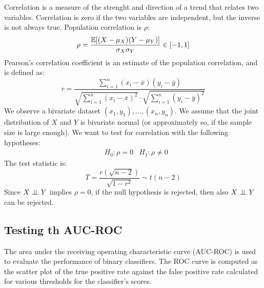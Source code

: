 Correlation is a measure of the strenght and direction of a trend that relates two variables. Correlation is zero if the two variables are independent, but the inverse is not always true. Population correlation is $\rho$:
\begin{equation*}
    \rho = \frac{\mathbb{E} [(X - \mu_X)(Y - \mu_Y)]}{\sigma_X \sigma_Y} \in [-1,1]
\end{equation*}
Pearson's correlation coefficient is an estimate of the population correlation, and is defined as:
\begin{equation*}
    r = \frac{\sum_{i=1}^n (x_i - \bar{x})(y_i - \bar{y})}{\sqrt{\sum_{i=1}^n (x_i - \bar{x})^2} \cdot \sqrt{\sum_{i=1}^n (y_i - \bar{y})^2}}
\end{equation*}
We observe a bivariate dataset $(x_1, y_1), \ldots, (x_n, y_n)$. We assume that the joint distribution of $X$ and $Y$ is bivariate normal (or approximately so, if the sample size is large enough). We want to test for correlation with the following hypotheses:
\begin{align*}
    &H_0 : \rho = 0 &H_1 : \rho \neq 0
\end{align*}
The test statistic is:
\begin{equation*}
    T = \frac{r(\sqrt{n-2})}{\sqrt{1 - r^2}} \sim t(n-2)
\end{equation*}
Since $X \perp \!\!\! \perp Y$ implies $\rho = 0$, if the null hypothesis is rejected, then also $X \perp \!\!\! \perp Y$ can be rejected.

\subsection{Testing th AUC-ROC}

The area under the receiving operating characteristic curve (AUC-ROC) is used to evaluate the performance of binary classifiers. The ROC curve is computed as the scatter plot of the true positive rate against the false positive rate calculated for various thresholds for the classifier's scores.

